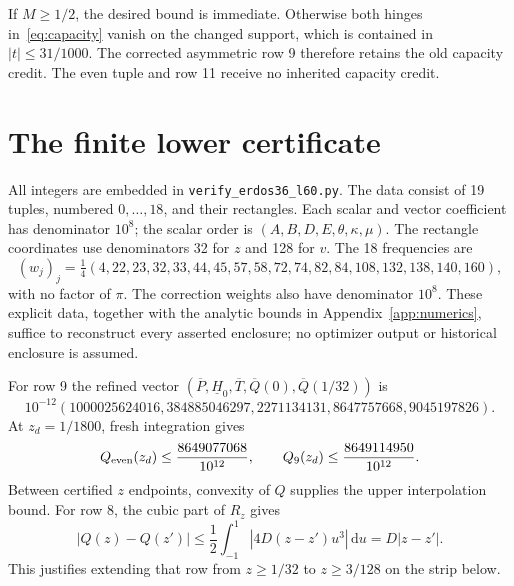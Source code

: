 \documentclass[10pt]{article}
\newcommand{\dd}{\,\mathrm d}
\begin{document}
If $M\geq1/2$, the desired bound is immediate. Otherwise both hinges in~\eqref{eq:capacity} vanish on the changed support, which is contained in $|t|\leq31/1000$.
The corrected asymmetric row 9 therefore retains the old capacity credit.
The even tuple and row 11 receive no inherited capacity credit.

\section{The finite lower certificate}\label{sec:certificate}
All integers are embedded in \texttt{verify\_erdos36\_l60.py}.
The data consist of 19 tuples, numbered $0,\ldots,18$, and their rectangles.
Each scalar and vector coefficient has denominator $10^8$; the scalar order is
$(A,B,D,E,\theta,\kappa,\mu)$.
The rectangle coordinates use denominators 32 for $z$ and 128 for $v$.
The 18 frequencies are
\[
(w_j)_j=\tfrac14(4,22,23,32,33,44,45,57,58,72,74,82,84,108,132,138,140,160),
\]
with no factor of $\pi$.
The correction weights also have denominator $10^8$.
These explicit data, together with the analytic bounds in Appendix~\ref{app:numerics}, suffice to reconstruct every asserted enclosure; no optimizer output or historical enclosure is assumed.

For row 9 the refined vector
$(\overline P,\underline H_0,\overline T,\overline Q(0),\overline Q(1/32))$ is
\begin{equation}\label{eq:refined-vector}
10^{-12}(1000025624016,384885046297,2271134131,8647757668,9045197826).
\end{equation}
At $z_d=1/1800$, fresh integration gives
\begin{equation}\label{eq:fresh-q}
Q_{\rm even}(z_d)\leq\frac{8649077068}{10^{12}},\qquad
Q_9(z_d)\leq\frac{8649114950}{10^{12}}.
\end{equation}
Between certified $z$ endpoints, convexity of $Q$ supplies the upper interpolation bound.
For row 8, the cubic part of $R_z$ gives
\[
|Q(z)-Q(z')|\leq\frac12\int_{-1}^1|4D(z-z')u^3|\dd u=D|z-z'|.
\]
This justifies extending that row from $z\geq1/32$ to $z\geq3/128$ on the strip below.
\end{document}
